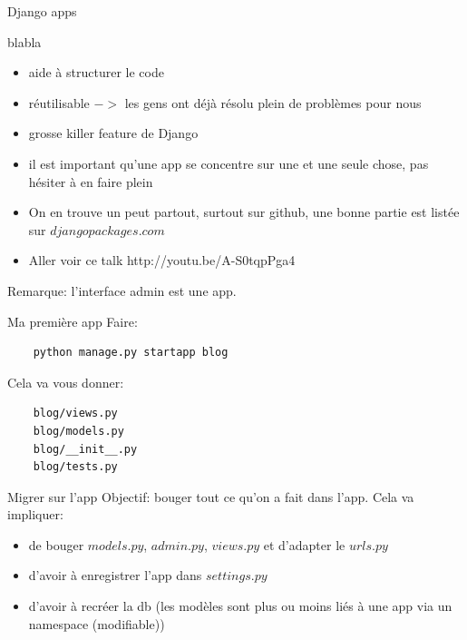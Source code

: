 \documentclass{beamer}
\begin{document}
\begin{frame}[fragile]{}
\begin{LARGE}
\begin{center}
Django apps
\end{center}
\end{LARGE}
\end{frame}

\begin{frame}[fragile]{blabla}
    \begin{itemize}
        \item aide à structurer le code\pause
        \item réutilisable $->$ les gens ont déjà résolu plein de problèmes pour nous\pause
        \item grosse killer feature de Django\pause
        \item il est important qu'une app se concentre sur une et une seule chose, pas hésiter à en faire plein\pause
        \item On en trouve un peut partout, surtout sur github, une bonne partie est listée sur $djangopackages.com$\pause
        \item Aller voir ce talk http://youtu.be/A-S0tqpPga4\pause
    \end{itemize}
    Remarque: l'interface admin est une app.
\end{frame}

\begin{frame}[fragile]{Ma première app}
    Faire:
\begin{verbatim}
    python manage.py startapp blog
\end{verbatim}
\pause

    Cela va vous donner:
\begin{verbatim}
    blog/views.py
    blog/models.py
    blog/__init__.py
    blog/tests.py
\end{verbatim}
\end{frame}

\begin{frame}[fragile]{Migrer sur l'app}
    Objectif: bouger tout ce qu'on a fait dans l'app. Cela va impliquer:
    \begin{itemize}
        \item de bouger $models.py$, $admin.py$, $views.py$ et d'adapter le $urls.py$
        \item d'avoir à enregistrer l'app dans $settings.py$
        \item d'avoir à recréer la db (les modèles sont plus ou moins liés à une app via un namespace (modifiable))
    \end{itemize}
\end{frame}
\end{document}
